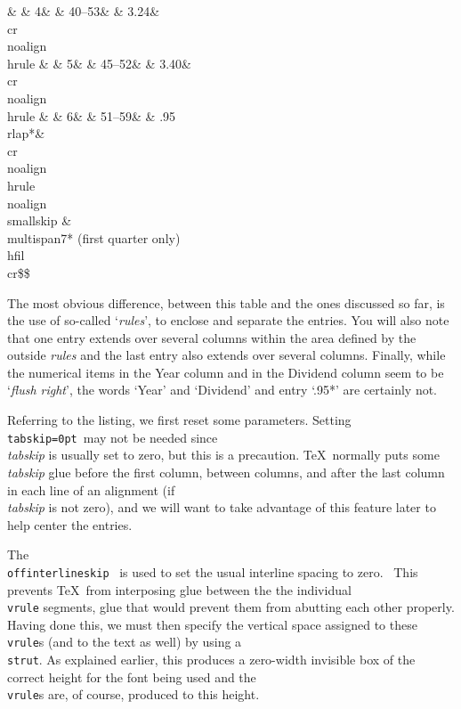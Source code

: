 {{\& \&    4\& \& 40--53\& \& 3.24\& \\cr \\noalign\lbr\\hrule\rbr\cr
\& \&    5\& \& 45--52\& \& 3.40\& \\cr \\noalign\lbr\\hrule\rbr\cr
\& \&    6\& \& 51--59\& \& .95\\rlap*\& \\cr \\noalign\lbr\\hrule\rbr\cr
\\noalign\lbr\\smallskip\rbr\cr
\& \\multispan7* (first quarter only)\\hfil\\cr\rrbr\$\$\cr}}

The most obvious difference, between this table and the ones discussed so far,
is the use of so-called `{\sl rules}', to enclose and separate the entries.
You will also note that one entry extends over several columns within the
area defined by the outside {\sl rules\/} and the last entry also extends
over several columns.  Finally, while the numerical items in the Year
column and in the Dividend column seem to be `{\sl flush right}', the
words `Year' and `Dividend' and entry `.95*' are certainly not.

Referring to the listing, we first reset some parameters.  Setting {\tt
\\tabskip=0pt}\ may not be needed since {\sl \\tabskip\/} is usually set
to zero, but this is a precaution.  \TeX\ normally puts some {\sl
tabskip\/} glue before the first column, between columns, and after the
last column in each line of an alignment (if {\sl \\tabskip\/} is not
zero), and we will want to take advantage of this feature later to help
center the entries.

The {\tt \\offinterlineskip} \cs\/\ is used to set the usual interline
spacing to zero.  \ This prevents \TeX\ from interposing glue between the
the individual {\tt \\vrule} segments, glue that would prevent them from
abutting each other properly. Having done this, we must 
then specify the vertical space assigned to these {\tt \\vrule}s (and to
the text as well) by using a {\tt \\strut}.  As explained earlier, this
produces a zero-width invisible box of the correct height for the font
being used and the {\tt \\vrule}s are, of course, produced to this height.

